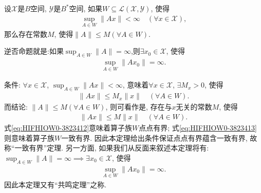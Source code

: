 \documentclass[../../main.tex]{subfiles}%
\begin{document}
\begin{theorem}[共鸣定理或一致有界定理]\label{theorem:泛函分析--共鸣定理}
设$\mathscr{X}$是$B$空间, $\mathscr{Y}$是$B^*$空间, 如果$W\subseteq\mathscr{L}(\mathscr{X},\mathscr{Y})$, 使得
\begin{align*}
\sup_{A\in W}\|Ax\| < \infty \quad (\forall x\in\mathscr{X}),
\end{align*}
那么存在常数$M$, 使得$\|A\|\leqslant M(\forall A\in W)$.

逆否命题就是:如果$\sup_{A\in W}\|A\|=\infty$,则$\exists x_0\in\mathscr{X}$, 使得
\begin{align*}
\sup_{A\in W}\|Ax_0\| = \infty.
\end{align*}
\end{theorem}
\begin{remark}
条件: $\forall x\in\mathscr{X}$, $\sup_{A\in W}\|Ax\|<\infty$, 意味着$\forall x\in\mathscr{X}$, $\exists M_x>0$, 使得
\begin{align}
\|Ax\| \leqslant M_x\|x\| \quad (\forall A\in W).
\label{eq:HIFHIOW0-3823412}
\end{align}
而结论: $\|A\|\leqslant M(\forall A\in W)$, 则可看作是, 存在与$x$无关的常数$M$, 使得
\begin{align}
\|Ax\| \leqslant M\|x\| \quad (\forall A\in W).
\label{eq:HIFHIOW0-3823413}
\end{align}
式\eqref{eq:HIFHIOW0-3823412}意味着算子族$W$点点有界; 式\eqref{eq:HIFHIOW0-3823413}则意味着算子族$W$一致有界. 因此本定理给出条件保证点点有界蕴含一致有界, 故称“一致有界”定理. 另一方面, 如果我们从反面来叙述本定理将有: $\sup_{A\in W}\|A\|=\infty\implies\exists x_0\in\mathscr{X}$, 使得
\begin{align*}
\sup_{A\in W}\|Ax_0\| = \infty.
\end{align*}
因此本定理又有“共鸣定理”之称.
\end{remark}
\end{document}
